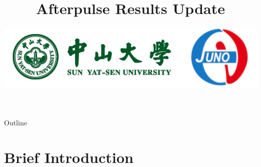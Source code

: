 \documentclass[11pt,compress,xcolor=x11names,UTF8]{beamer}
\title{Afterpulse Results Update}
\author[Yu Chen&& Rong Zhao ]{Email：zhaor25@mail2.sysu.edu.cn \and  } %
\institute[SYSU]{School of Physics\and } %
\date[\today]{\includegraphics[width=.5\textwidth]{logo}}
\begin{document}
\maketitle

\begin{frame}{Outline}
\tableofcontents
\end{frame}

\section{Brief Introduction}

\end{document}
